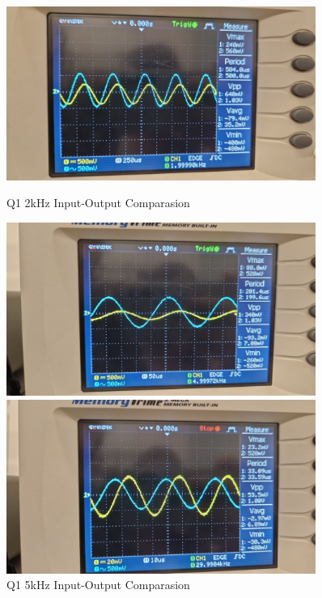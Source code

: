 \begin{figure}[h]
    \centering
    \begin{minipage}{0.5\textwidth}
        \includegraphics[width=0.9\textwidth , height=0.2\textheight]{assets/exp/q1-2kHz-1vpp-comp.jpeg}
        \caption{Q1 2kHz Input-Output Comparasion}
        \label{fig:q1-2kHz-1vpp-comp}
    \end{minipage}%
    \begin{minipage}{0.5\textwidth}
        \includegraphics[width=0.9\textwidth , height=0.2\textheight]{assets/exp/q1-5kHz-1vpp-comp.jpeg}
        \caption{Q1 5kHz Input-Output Comparasion}
        \label{fig:q1-5kHz-1vpp-comp}
    \end{minipage}
    \begin{minipage}{0.5\textwidth}
        \includegraphics[width=0.9\textwidth , height=0.2\textheight]{assets/exp/q1-30kHz-1vpp-comp.jpeg}

\end{minipage}
\end{figure}
